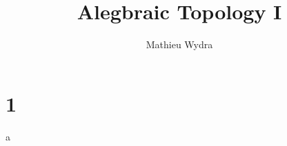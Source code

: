 \documentclass[10pt,a4paper]{article}
\title{Alegbraic Topology I}
\author{Mathieu Wydra}
\date{}
\begin{document}
\section{1}
a
\end{document}
